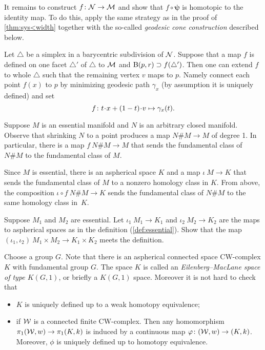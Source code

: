It remains to construct $f\colon\mathcal{N}\to\mathcal{M}$ and show that $f\circ\bm{\psi}$ is homotopic to the identity map.
To do this, apply the same strategy as in the proof of \ref{thm:sys<width} together with the so-called \emph{geodesic cone construction}
described below.

Let $\triangle$ be a simplex in a barycentric subdivision of $\mathcal{N}$.
Suppose that a map $f$ is defined on one facet $\triangle'$ of $\triangle$ to $\mathcal{M}$ and $\mathrm{B}{}(p,r)\supset f(\triangle')$.
Then one can extend $f$ to whole $\triangle$ such that the remaining vertex $v$ maps to $p$.
Namely connect each point $f(x)$ to $p$ by minimizing geodesic path $\gamma_x$ (by assumption it is uniquely defined) and set
\[f
\:
t\cdot x\z+(1-t)\cdot v
\mapsto
\gamma_x(t).\]

Suppose $M$ is an essential manifold and $N$ is an arbitrary closed manifold.
Observe that shrinking $N$ to a point produces a map $N\#M\to M$ of degree 1.
In particular, there is a map $f\:N\#M\to M$ that sends the fundamental class of $N\#M$ to the fundamental class of $M$.

Since $M$ is essential, there is an aspherical space $K$ and a map $\iota\:M\to K$ that sends the fundamental class of $M$ to a nonzero homology class in $K$.
From above, the composition $\iota\circ f\:N\#M\to K$ sends the fundamental class of $N\#M$ to the same homology class in~$K$.


Suppose $M_1$ and $M_2$ are essential.
Let $\iota_1\:M_1\to K_1$ and $\iota_2\:M_2\to K_2$ are the maps to aspherical spaces as in the definition (\ref{def:essential}).
Show that the map
$(\iota_1,\iota_2)\:M_1\times M_2\to K_1\times K_2$
meets the definition.

Choose a group $G$.
Note that there is an aspherical connected space CW-complex $K$ with fundamental group $G$.
The space $K$ is called an \emph{Eilenberg--MacLane space of type $K(G,1)$}, or briefly a $K(G,1)$ space.
Moreover it is not hard to check that
\begin{itemize}
\item $K$ is uniquely defined up to a weak homotopy equivalence;
\item if $\mathcal{W}$ is a connected finite CW-complex.
Then any homomorphism $\pi_1(\mathcal{W},w)\to\pi_1(K,k)$ is induced by a continuous map $\varphi\colon(\mathcal{W},w)\to(K,k)$.
Moreover, $\phi$ is uniquely defined up to homotopy equivalence.
\end{itemize}


